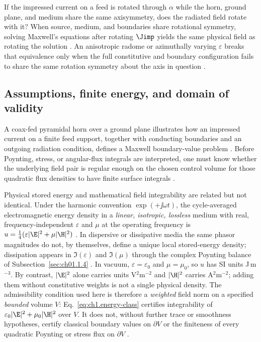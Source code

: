 If the impressed current on a feed is rotated through $\alpha$ while the horn, ground
plane, and medium share the same axisymmetry, does the radiated field rotate with it?
When source, medium, and boundaries share rotational symmetry, solving Maxwell's
equations after rotating $\Jimp$ yields the same physical field as rotating the
solution \cite{stratton1941,hansen1988}. An anisotropic radome or azimuthally varying $\varepsilon$ breaks that equivalence only when the full constitutive and boundary configuration fails to share the same rotation symmetry about the axis in question \cite{stratton1941}.

\subsection{Assumptions, finite energy, and domain of validity}
\label{sec:ch01.0.3}

A coax-fed pyramidal horn over a ground plane illustrates how an impressed current on a finite feed support, together with conducting boundaries and an outgoing radiation condition, defines a Maxwell boundary-value problem \cite{stratton1941}. Before Poynting, stress, or angular-flux integrals are interpreted, one must know whether the underlying field pair is regular enough on the chosen control volume for those quadratic flux densities to have finite surface integrals \cite{maxwell1873,poynting1884,stratton1941}.

Physical stored energy and mathematical field integrability are related but not identical. Under the harmonic convention \(\exp(+\jj\omega t)\), the cycle-averaged electromagnetic energy density in a \emph{linear, isotropic, lossless} medium with real, frequency-independent \(\varepsilon\) and \(\mu\) at the operating frequency is \(u=\tfrac14(\varepsilon|\E|^{2}+\mu|\H|^{2})\) \cite{stratton1941}. In dispersive or dissipative media the same phasor magnitudes do not, by themselves, define a unique local stored-energy density; dissipation appears in \(\Im(\varepsilon)\) and \(\Im(\mu)\) through the complex Poynting balance of Subsection~\ref{sec:ch01.1.4} \cite{stratton1941,harrington2001}. In vacuum, \(\varepsilon=\varepsilon_0\) and \(\mu=\mu_0\), so \(u\) has SI units J\,m\(^{-3}\). By contrast, \(|\E|^{2}\) alone carries units V\(^2\)m\(^{-2}\) and \(|\H|^{2}\) carries A\(^2\)m\(^{-2}\); adding them without constitutive weights is not a single physical density. The admissibility condition used here is therefore a \emph{weighted} field norm on a specified \emph{bounded} volume \(V\): Eq.~\eqref{eq:ch1.energy-class} certifies integrability of \(\varepsilon_0|\E|^{2}+\mu_0|\H|^{2}\) over \(V\). It does not, without further trace or smoothness hypotheses, certify classical boundary values on \(\partial V\) or the finiteness of every quadratic Poynting or stress flux on \(\partial V\) \cite{stratton1941}.

